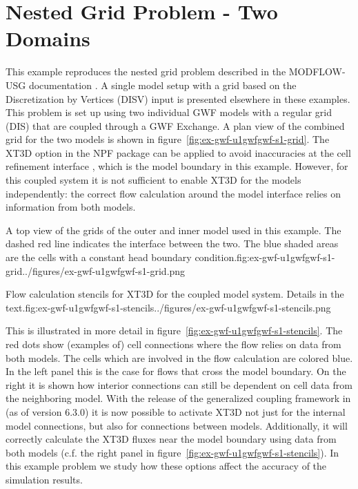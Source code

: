 \section{Nested Grid Problem - Two Domains}

This example reproduces the nested grid problem described in the MODFLOW-USG documentation \citep{modflowusg}. A single model setup with a grid based on the Discretization by Vertices (DISV) input is presented elsewhere in these examples. This problem is set up using two individual GWF models with a regular grid (DIS) that are coupled through a GWF Exchange. A plan view of the combined grid for the two models is shown in figure~\ref{fig:ex-gwf-u1gwfgwf-s1-grid}. The XT3D option in the NPF package can be applied to avoid inaccuracies at the cell refinement interface \citep{modflow6xt3d}, which is the model boundary in this example. However, for this coupled system it is not sufficient to enable XT3D for the models independently: the correct flow calculation around the model interface relies on information from both models.

\begin{StandardFigure}{A top view of the grids of the outer and inner model used in this example. The dashed red line indicates the interface between the two. The blue shaded areas are the cells with a constant head boundary condition.}{fig:ex-gwf-u1gwfgwf-s1-grid}{../figures/ex-gwf-u1gwfgwf-s1-grid.png}
\end{StandardFigure}

\begin{StandardFigure}{Flow calculation stencils for XT3D for the coupled model system. Details in the text.}{fig:ex-gwf-u1gwfgwf-s1-stencils}{../figures/ex-gwf-u1gwfgwf-s1-stencils.png}
\end{StandardFigure} 

This is illustrated in more detail in figure~\ref{fig:ex-gwf-u1gwfgwf-s1-stencils}. The red dots show (examples of) cell connections where the flow relies on data from both models. The cells which are involved in the flow calculation are colored blue. In the left panel this is the case for flows that cross the model boundary. On the right it is shown how interior connections can still be dependent on cell data from the neighboring model. With the release of the generalized coupling framework in \mf (as of version 6.3.0) it is now possible to activate XT3D not just for the internal model connections, but also for connections between models. Additionally, it will correctly calculate the XT3D fluxes near the model boundary using data from both models (c.f. the right panel in figure~\ref{fig:ex-gwf-u1gwfgwf-s1-stencils}). In this example problem we study how these options affect the accuracy of the simulation results.


